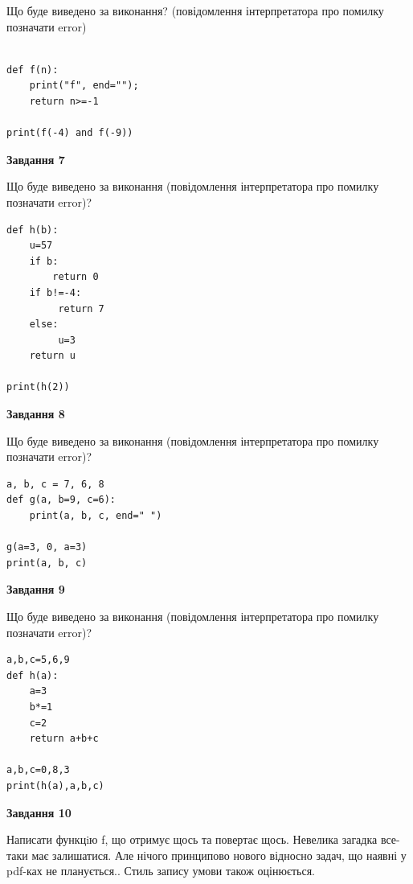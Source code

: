 \documentclass[12pt, ukrainian]{article}
\begin{document}
{\begin {large}
Що буде виведено за виконання? (повідомлення інтерпретатора про помилку позначати error)\par
\begin{verbatim}

def f(n):
    print("f", end="");
    return n>=-1

print(f(-4) and f(-9))
\end{verbatim}

{\begin {center}\textbf{Завдання 7}\end {center}}

Що буде виведено за виконання (повідомлення інтерпретатора про помилку позначати error)?\par
\begin{verbatim}
def h(b):
    u=57
    if b: 
        return 0
    if b!=-4:
         return 7
    else:
         u=3
    return u

print(h(2))
\end{verbatim}

{\begin {center}\textbf{Завдання 8}\end {center}}

Що буде виведено за виконання (повідомлення інтерпретатора про помилку позначати error)?\par
\begin{verbatim}
a, b, c = 7, 6, 8
def g(a, b=9, c=6):
    print(a, b, c, end=" ")

g(a=3, 0, a=3)
print(a, b, c)
\end{verbatim}

{\begin {center}\textbf{Завдання 9}\end {center}}

Що буде виведено за виконання (повідомлення інтерпретатора про помилку позначати error)?\par
\begin{verbatim}
a,b,c=5,6,9
def h(a):
    a=3
    b*=1
    c=2
    return a+b+c

a,b,c=0,8,3
print(h(a),a,b,c)
\end{verbatim}

{\begin {center}\textbf{Завдання 10}\end {center}}


Написати функцiю f, що отримує щось та повертає щось. Невелика загадка все-таки має залишатися. Але нічого принципово нового відносно задач, що наявні у pdf-ках не планується.. Стиль запису умови також оцінюється.\par
\end {large}}
\newpage
\end{document}
